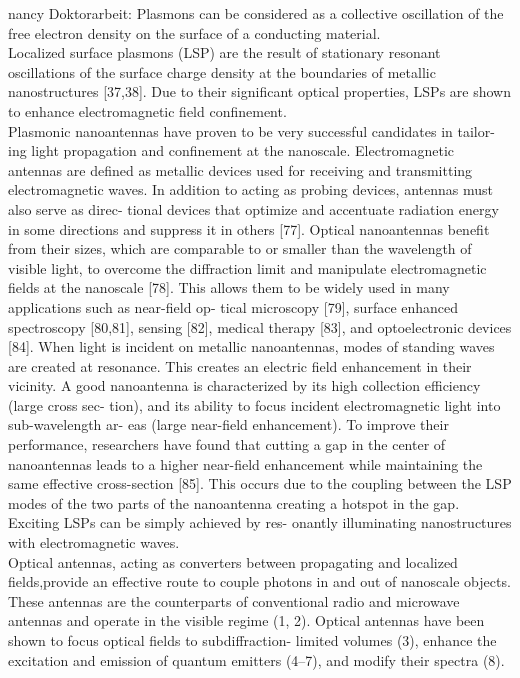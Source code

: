 		nancy Doktorarbeit:
		Plasmons can be considered as a collective oscillation of the free electron density on the surface of a conducting material.
		\\
		Localized surface plasmons (LSP) are the result of stationary resonant oscillations of the surface charge density at the boundaries of metallic nanostructures [37,38]. Due to their significant optical properties, LSPs are shown to enhance electromagnetic field confinement.
		\\
		Plasmonic nanoantennas have proven to be very successful candidates in tailor- ing light propagation and confinement at the nanoscale. Electromagnetic antennas are defined as metallic devices used for receiving and transmitting electromagnetic waves. In addition to acting as probing devices, antennas must also serve as direc- tional devices that optimize and accentuate radiation energy in some directions and suppress it in others [77]. Optical nanoantennas benefit from their sizes, which are comparable to or smaller than the wavelength of visible light, to overcome the diffraction limit and manipulate electromagnetic fields at the nanoscale [78]. This allows them to be widely used in many applications such as near-field op- tical microscopy [79], surface enhanced spectroscopy [80,81], sensing [82], medical therapy [83], and optoelectronic devices [84].
		When light is incident on metallic nanoantennas, modes of standing waves are created at resonance. This creates an electric field enhancement in their vicinity. A good nanoantenna is characterized by its high collection efficiency (large cross sec- tion), and its ability to focus incident electromagnetic light into sub-wavelength ar- eas (large near-field enhancement). To improve their performance, researchers have found that cutting a gap in the center of nanoantennas leads to a higher near-field enhancement while maintaining the same effective cross-section [85]. This occurs due to the coupling between the LSP modes of the two parts of the nanoantenna creating a hotspot in the gap.
		Exciting LSPs can be simply achieved by res- onantly illuminating nanostructures with electromagnetic waves.
		\\
		\cite{Curto2010}
		Optical antennas, acting as converters between propagating and localized fields,provide an effective route to couple photons in and out of nanoscale objects. These antennas are the counterparts of conventional radio and microwave antennas and operate in the visible regime (1, 2). Optical antennas have been shown to focus optical fields to subdiffraction- limited volumes (3), enhance the excitation and emission of quantum emitters (4–7), and modify their spectra (8).
